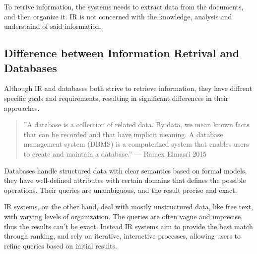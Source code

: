 \documentclass[a4paper]{tufte-handout}
\begin{document}
\vspace{1em}

To retrive information, the systems needs to extract data from the documents, and then organize it. IR is not concerned with the knowledge, analysis and understaind of said information. 

\subsection{Difference between Information Retrival and Databases}

Although IR and databases both strive to retrieve information, they have diffrent specific goals and requirements, resulting in significant differences in their approaches.

\begin{quote}
	''A database is a collection of related data. By data, we mean known facts that can be recorded and that have implicit meaning. A database management system (DBMS) is a computerized system that enables users to create and maintain a database.'' --- Ramex Elmasri 2015\cite{Elmasri2015}
\end{quote}

Databases handle structured data with clear semantics based on formal models, they have well-defined attributes with certain domains that defines the possible operations. Their queries are unambiguous, and the result precise and exact.

IR systems, on the other hand, deal with mostly unstructured data, like free text, with varying levels of organization. The queries are often vague and imprecise, thus the results can't be exact. Instead IR systems aim to provide the best match through ranking, and rely on iterative, interactive processes, allowing users to refine queries based on initial results.




\newpage




\end{document}
